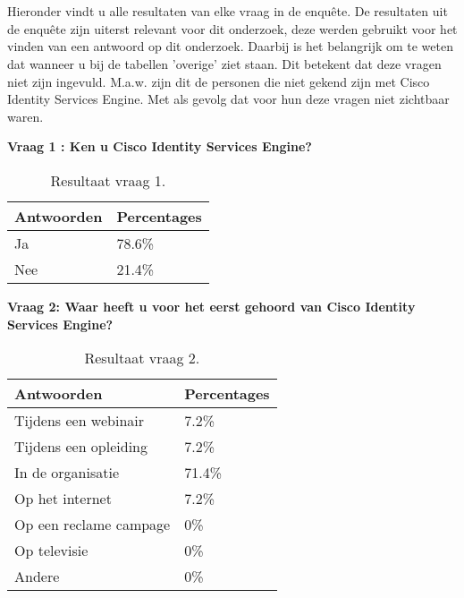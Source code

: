 \chapter{}
\label{ch:Resultaten_enquête}

Hieronder vindt u alle resultaten van elke vraag in de enquête. De resultaten uit de enquête zijn uiterst relevant voor dit onderzoek, deze werden gebruikt voor het vinden van een antwoord op dit onderzoek. Daarbij is het belangrijk om te weten dat wanneer u bij de tabellen 'overige' ziet staan. Dit betekent dat deze vragen niet zijn ingevuld. M.a.w. zijn dit de personen die niet gekend zijn met Cisco Identity Services Engine. Met als gevolg dat voor hun deze vragen niet zichtbaar waren.
\newline

\textbf{Vraag 1 : Ken u Cisco Identity Services Engine?}
\begin{table}[h!]
\begin{center}
		\begin{tabular}{|l|l|}
			\hline
			\bf Antwoorden    & \bf Percentages \\ \hline
			Ja  & 78.6\% \\ \hline
			Nee & 21.4\% \\ \hline
		\end{tabular}
	\caption{Resultaat vraag 1.}
\end{center}
\end{table}

\newpage
\textbf{Vraag 2: Waar heeft u voor het eerst gehoord van Cisco Identity Services Engine?}
\begin{table}[H]
	\begin{center}
		\begin{tabular}{|l|l|}
			\hline
			\bf Antwoorden    & \bf Percentages \\ \hline
			Tijdens een webinair   & 7.2\%  \\ \hline
			Tijdens een opleiding  & 7.2\%  \\ \hline
			In de organisatie      & 71.4\% \\ \hline
			Op het internet        & 7.2\%  \\ \hline
			Op een reclame campage & 0\%    \\ \hline
			Op televisie           & 0\%    \\ \hline
			Andere                 & 0\%    \\ \hline
		\end{tabular}
		\caption{Resultaat vraag 2.}
	\end{center}
\end{table}


